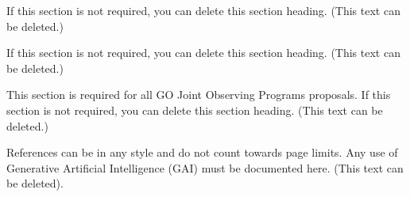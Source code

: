 \documentclass[12pt]{article}
\begin{document}
If this section is not required, you can delete this section heading. (This text can be deleted.)


%
%
\duplications          

If this section is not required, you can delete this section heading. (This text can be deleted.)


%
%
\coordinatedotherfacilities    

This section is required for all GO Joint Observing Programs proposals. If this section is not required, you can delete this section heading. (This text can be deleted.)



%
%

References can be in any style and do not count towards page limits. Any use of Generative Artificial Intelligence (GAI) must be documented here. (This text can be deleted).




\noindent\templateversion %
\end{document}
